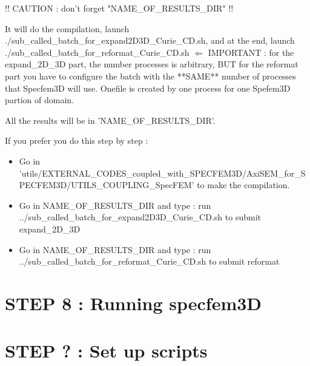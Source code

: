 \documentclass[11pt]{article}
\begin{document}
\medskip

\noindent !! CAUTION : don't forget "NAME\_OF\_RESULTS\_DIR" !!

\medskip

\noindent It will do the compilation, launch ./sub\_called\_batch\_for\_expand2D3D\_Curie\_CD.sh, and at the end, launch ./sub\_called\_batch\_for\_reformat\_Curie\_CD.sh $\Longleftarrow$ IMPORTANT : for the expand\_2D\_3D part, the number processes is arbitrary, BUT for the reformat part you have to configure the batch with the **SAME** number of processes that Specfem3D will use. Onefile is created by one process for one Spefem3D partion of domain.

\smallskip

\noindent All the results will be in 'NAME\_OF\_RESULTS\_DIR'.

\bigskip

\noindent If you prefer you do this step by step :

\begin{itemize}

\item[\textbullet] Go in {\scriptsize 'utils/EXTERNAL\_CODES\_coupled\_with\_SPECFEM3D/AxiSEM\_for\_SPECFEM3D/UTILS\_COUPLING\_SpecFEM'} to make the compilation.
\item[\textbullet] Go in NAME\_OF\_RESULTS\_DIR and type : run ../sub\_called\_batch\_for\_expand2D3D\_Curie\_CD.sh to submit expand\_2D\_3D
\item[\textbullet] Go in NAME\_OF\_RESULTS\_DIR and type : run ../sub\_called\_batch\_for\_reformat\_Curie\_CD.sh to submit reformat

\end{itemize}

\section{STEP 8 : Running specfem3D}


\section{STEP ? : Set up scripts}
\end{document}
